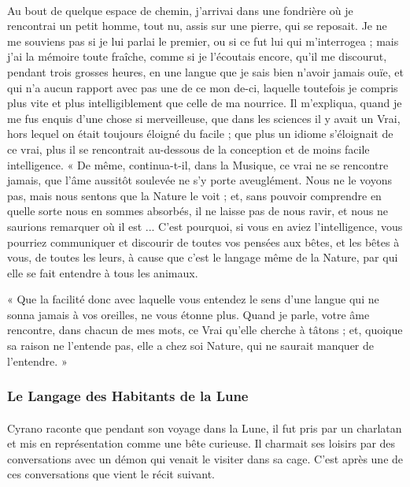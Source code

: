 \documentclass[a4paper, 11pt, oneside]{article}
\begin{document}
\paragraph{}
Au bout de quelque espace de chemin, j'arrivai dans une fondrière où je rencontrai un petit homme, tout nu, assis sur une pierre, qui se reposait. Je ne me souviens pas si je lui parlai le premier, ou si ce fut lui qui m'interrogea ; mais j'ai la mémoire toute fraîche, comme si je l'écoutais encore, qu'il me discourut, pendant trois grosses heures, en une langue que je sais bien n'avoir jamais ouïe, et qui n'a aucun rapport avec pas une de ce mon de-ci, laquelle toutefois je compris plus vite et plus intelligiblement que celle de ma nourrice. Il m'expliqua, quand je me fus enquis d'une chose si merveilleuse, que dans les sciences il y avait un Vrai, hors lequel on était toujours éloigné du facile ; que plus un idiome s'éloignait de ce vrai, plus il se rencontrait au-dessous de la conception et de moins facile intelligence. « De même, continua-t-il, dans la Musique, ce vrai ne se rencontre jamais, que l'âme aussitôt soulevée ne s'y porte aveuglément. Nous ne le voyons pas, mais nous sentons que la Nature le voit ; et, sans pouvoir comprendre en quelle sorte nous en sommes absorbés, il ne laisse pas de nous ravir, et nous ne saurions remarquer où il est ... C'est pourquoi, si vous en aviez l'intelligence, vous pourriez communiquer et discourir de toutes vos pensées aux bêtes, et les bêtes à vous, de toutes les leurs, à cause que c'est le langage même de la Nature, par qui elle se fait entendre à tous les animaux.

« Que la facilité donc avec laquelle vous entendez le sens d'une langue qui ne sonna jamais à vos oreilles, ne vous étonne plus. Quand je parle, votre âme rencontre, dans chacun de mes mots, ce Vrai qu'elle cherche à tâtons ; et, quoique sa raison ne l'entende pas, elle a chez soi Nature, qui ne saurait manquer de l'entendre. »

\subsubsection{Le Langage des Habitants de la Lune}
\paragraph{}
Cyrano raconte que pendant son voyage dans la Lune, il fut pris par un charlatan et mis en représentation comme une bête curieuse. Il charmait ses loisirs par des conversations avec un démon qui venait le visiter dans sa cage. C'est après une de ces conversations que vient le récit suivant.
\end{document}
